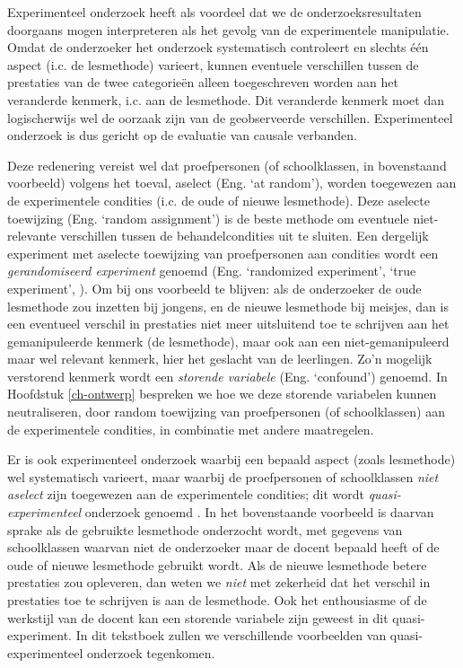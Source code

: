\documentclass[
]{book}
\begin{document}
Experimenteel onderzoek heeft als voordeel dat we de
onderzoeksresultaten doorgaans mogen interpreteren als het gevolg van de
experimentele manipulatie. Omdat de onderzoeker het onderzoek
systematisch controleert en slechts één aspect (i.c. de lesmethode)
varieert, kunnen eventuele verschillen tussen de prestaties van de twee
categorieën alleen toegeschreven worden aan het veranderde kenmerk, i.c.
aan de lesmethode. Dit veranderde kenmerk moet dan logischerwijs wel de
oorzaak zijn van de geobserveerde verschillen. Experimenteel onderzoek
is dus gericht op de evaluatie van causale verbanden.

Deze redenering vereist wel dat proefpersonen (of schoolklassen, in
bovenstaand voorbeeld) volgens het toeval, aselect (Eng. `at random'),
worden toegewezen aan de experimentele condities (i.c. de oude of nieuwe
lesmethode). Deze aselecte toewijzing (Eng. `random assignment') is de
beste methode om eventuele niet-relevante verschillen tussen de
behandelcondities uit te sluiten. Een dergelijk experiment met aselecte
toewijzing van proefpersonen aan condities wordt een \emph{gerandomiseerd
experiment} genoemd (Eng. `randomized experiment', `true experiment', ).
Om bij ons voorbeeld te blijven: als de onderzoeker de oude lesmethode
zou inzetten bij jongens, en de nieuwe lesmethode bij meisjes, dan is
een eventueel verschil in prestaties niet meer uitsluitend toe te
schrijven aan het gemanipuleerde kenmerk (de lesmethode), maar ook aan
een niet-gemanipuleerd maar wel relevant kenmerk, hier het geslacht van
de leerlingen. Zo'n mogelijk verstorend kenmerk wordt een \emph{storende
variabele} (Eng. `confound') genoemd. In
Hoofdstuk \ref{ch-ontwerp} bespreken we hoe we deze storende variabelen
kunnen neutraliseren, door random toewijzing van proefpersonen (of
schoolklassen) aan de experimentele condities, in combinatie met andere maatregelen.

Er is ook experimenteel onderzoek waarbij een bepaald aspect (zoals
lesmethode) wel systematisch varieert, maar waarbij de proefpersonen of
schoolklassen \emph{niet aselect} zijn toegewezen aan de experimentele
condities; dit wordt \emph{quasi-experimenteel} onderzoek genoemd \citep{SCC02}.
In het bovenstaande voorbeeld is daarvan sprake als de gebruikte
lesmethode onderzocht wordt, met gegevens van schoolklassen waarvan niet
de onderzoeker maar de docent bepaald heeft of de oude of nieuwe
lesmethode gebruikt wordt. Als de nieuwe lesmethode betere prestaties
zou opleveren, dan weten we \emph{niet} met zekerheid dat het verschil in
prestaties toe te schrijven is aan de lesmethode. Ook het enthousiasme
of de werkstijl van de docent kan een storende variabele zijn geweest in dit quasi-experiment. In dit tekstboek zullen we verschillende
voorbeelden van quasi-experimenteel onderzoek tegenkomen.
\end{document}
